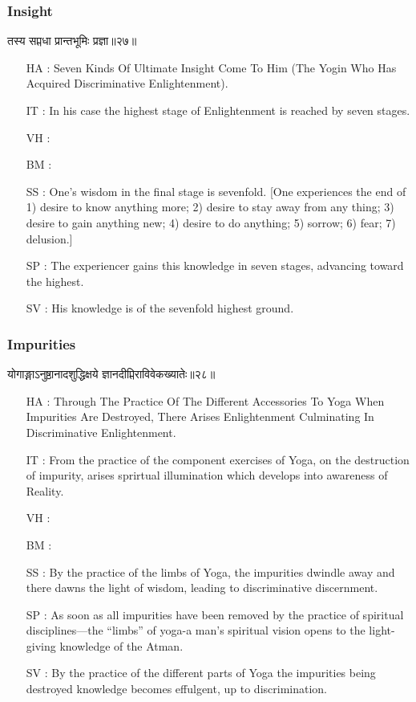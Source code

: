 \begin{frame}[fragile]\frametitle{Insight}
\begin{sanskrit}
तस्य सप्तधा प्रान्तभूमिः प्रज्ञा॥२७॥
\end{sanskrit}

	\begin{itemize}
	\item [HA]: Seven Kinds Of Ultimate Insight Come To Him (The Yogin Who Has Acquired Discriminative Enlightenment).
	\item [IT]: In his case the highest stage of Enlightenment is reached by seven stages.
	\item [VH]: 
	\item [BM]: 
	\item [SS]: One’s wisdom in the final stage is sevenfold. [One experiences the end of 1) desire to know anything more; 2) desire to stay away from any thing; 3) desire to gain anything new; 4) desire to do anything; 5) sorrow; 6) fear; 7) delusion.]
	\item [SP]: The experiencer gains this knowledge in seven stages, advancing toward the highest.
	\item [SV]: His knowledge is of the sevenfold highest ground. 
	\end{itemize}
\end{frame}


\begin{frame}[fragile]\frametitle{Impurities}
\begin{sanskrit}
योगाङ्गाऽनुष्ठानादशुद्धिक्षये ज्ञानदीप्तिराविवेकख्यातेः॥२८॥
\end{sanskrit}

	\begin{itemize}
	\item [HA]: Through The Practice Of The Different Accessories To Yoga When Impurities Are Destroyed, There Arises Enlightenment Culminating In Discriminative Enlightenment.
	\item [IT]: From the practice of the component exercises of Yoga, on the destruction of impurity, arises sprirtual illumination which develops into awareness of Reality.
	\item [VH]: 
	\item [BM]: 
	\item [SS]: By the practice of the limbs of Yoga, the impurities dwindle away and there dawns the light of wisdom, leading to discriminative discernment.
	\item [SP]: As soon as all impurities have been removed by the practice of spiritual disciplines—the “limbs” of yoga-a man’s spiritual vision opens to the light-giving knowledge of the Atman.
	\item [SV]: By the practice of the different parts of Yoga the impurities being destroyed knowledge becomes effulgent, up to discrimination. 
	\end{itemize}
\end{frame}

